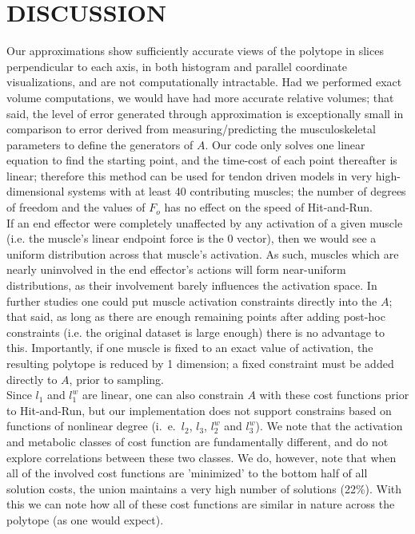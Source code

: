 \section{DISCUSSION}

Our approximations show sufficiently accurate views of the polytope in slices perpendicular to each axis, in both histogram and parallel coordinate visualizations, and are not computationally intractable.
Had we performed exact volume computations, we would have had more accurate relative volumes; that said, the level of error generated through approximation is exceptionally small in comparison to error derived from measuring/predicting the musculoskeletal parameters to define the generators of $A$.
Our code only solves one linear equation to find the starting point, and the time-cost of each point thereafter is linear; therefore this method can be used for tendon driven models in very high-dimensional systems with at least 40 contributing muscles; the number of degrees of freedom and the values of $F_o$ has no effect on the speed of Hit-and-Run.\\

If an end effector were completely unaffected by any activation of a given muscle (i.e. the muscle's linear endpoint force is the 0 vector), then we would see a uniform distribution across that muscle's activation. As such, muscles which are nearly uninvolved in the end effector's actions will form near-uniform distributions, as their involvement barely influences the activation space.
In further studies one could put muscle activation constraints directly into the $A$; that said, as long as there are enough remaining points after adding post-hoc constraints (i.e. the original dataset is large enough) there is no advantage to this.
Importantly, if one muscle is fixed to an exact value of activation, the resulting polytope is reduced by 1 dimension; a fixed constraint must be added directly to $A$, prior to sampling.\\
Since $l_1$ and $l_1^w$ are linear, one can also constrain $A$ with these cost functions prior to Hit-and-Run, but our implementation does not support constrains based on functions of nonlinear degree (i.\ e.\ $l_2$, $l_3$, $l_2^w$ and $l_3^w$).
We note that the activation and metabolic classes of cost function are fundamentally different, and do not explore correlations between these two classes.
We do, however, note that when all of the involved cost functions are 'minimized' to the bottom half of all solution costs, the union maintains a very high number of solutions (22\%).
With this we can note how all of these cost functions are similar in nature across the polytope (as one would expect).\\

